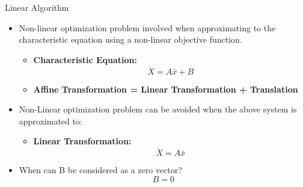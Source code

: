 \documentclass{beamer}
\begin{document}
\begin{frame}{Linear Algorithm}
\begin{itemize}
\item Non-linear optimization problem involved when approximating to the characteristic equation using a non-linear objective function. 
\begin{itemize}
\item \textbf{Characteristic Equation:}        	\begin{equation}
       		\dot{X} = A\bar{x} + B
       	\end{equation}
\item \textbf{Affine Transformation = Linear Transformation + Translation}
\end{itemize}
\item Non-Linear optimization problem can be avoided when the above system is approximated to:
\begin{itemize}
\item \textbf{Linear Transformation:} 
\begin{equation}
       		\dot{X} = A\bar{x}
       	\end{equation}
\end{itemize}
\item When can B be considered as a zero vector?
\begin{equation}
       		 B = 0
       	\end{equation}
\end{itemize}
\end{frame}
\end{document}
